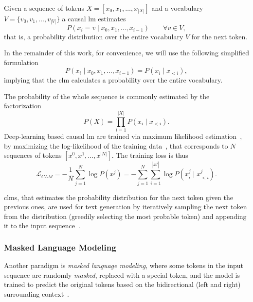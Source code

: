 Given a sequence of tokens $X = [x_0, x_1, \ldots, x_{|X|}]$ and a vocabulary $V = \{v_0, v_1, \ldots, v_{|V|}\}$ a causal \ac{lm} estimates
\begin{equation}
    \label{eq:clm}
    P(x_i=v \mid x_0, x_1, \ldots, x_{i-1}) \qquad \forall v \in V,
\end{equation}
that is, a probability distribution over the entire vocabulary $V$ for the next token.

In the remainder of this work, for convenience, we will use the following simplified formulation
\begin{equation}
    P(x_i \mid x_0, x_1, \ldots, x_{i-1}) = P(x_i \mid x_{<i}),
\end{equation}
implying that the \ac{clm} calculates a probability over the entire vocabulary.

The probability of the whole sequence is commonly estimated by the factorization~\cite{jm3}
\begin{equation}
    P(X) = \prod_{i=1}^{|X|} P(x_i \mid x_{<i}).
\end{equation}
Deep-learning based causal \ac{lm} are trained via maximum likelihood estimation~\cite{jain-etal-2023-cl-for-causal-lm}, \ie by maximizing the log-likelihood of the training data~\cite{MLE_tutorial}, that corresponds to $N$ sequences of tokens $[x^0, x^1, \ldots, x^{|N|}]$. The training loss is thus
\begin{equation}
    \mathcal{L}_{CLM} = - \frac{1}{N} \sum_{j=1}^{N} \log P(x^j) = - \sum_{j=1}^{N} \sum_{i=1}^{|x^j|} \log P(x_i^j \mid x_{<i}^j).
\end{equation}

\Aclp{clm}, that estimates the probability distribution for the next token given the previous ones, are used for text generation by iteratively sampling the next token from the distribution (\eg greedily selecting the most probable token) and appending it to the input sequence~\cite{jm3}. 

\subsubsection{Masked Language Modeling}

Another paradigm is \emph{masked language modeling}, where some tokens in the input sequence are randomly \emph{masked}, \ie replaced with a special token, and the model is trained to predict the original tokens based on the bidirectional (left and right) surrounding context~\cite{devlin-etal-2019-bert}.

